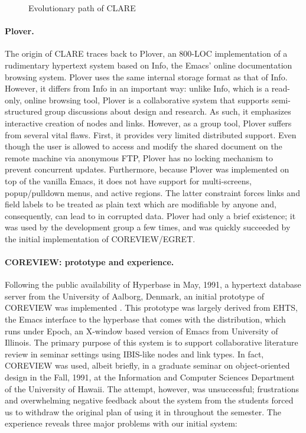 \begin{figure}
  \caption{Evolutionary path of CLARE}
  \label{fig:history}
\end{figure}


\paragraph{Plover.}
\label{sec:plover}

The origin of CLARE traces back to {\sf Plover\/}, an 800-LOC
implementation of a rudimentary hypertext system based on {\sf Info\/}, the
Emacs' online documentation browsing system. Plover uses the same internal
storage format as that of Info. However, it differs from Info in an
important way: unlike Info, which is a read-only, online browsing tool,
Plover is a collaborative system that supports semi-structured group
discussions about design and research. As such, it emphasizes interactive
creation of nodes and links. However, as a group tool, Plover suffers from
several vital flaws. First, it provides very limited distributed support.
Even though the user is allowed to access and modify the shared document on
the remote machine via anonymous FTP, Plover has no locking mechanism to
prevent concurrent updates.  Furthermore, because Plover was implemented on
top of the vanilla Emacs, it does not have support for multi-screens,
popup/pulldown menus, and active regions.  The latter constraint forces
links and field labels to be treated as plain text which are modifiable by
anyone and, consequently, can lead to in corrupted data.  Plover had only a
brief existence; it was used by the development group a few times, and was
quickly succeeded by the initial implementation of COREVIEW/EGRET.


\paragraph{COREVIEW: prototype and experience.}
\label{sec:coreview}

Following the public availability of Hyperbase in May, 1991, a hypertext
database server from the University of Aalborg, Denmark, an initial
prototype of COREVIEW was implemented \cite{csdl-92-03}. This prototype was
largely derived from EHTS, the Emacs interface to the hyperbase that comes
with the distribution, which runs under Epoch, an X-window based version of
Emacs from University of Illinois. The primary purpose of this system is to
support collaborative literature review in seminar settings using IBIS-like
nodes and link types. In fact, COREVIEW was used, albeit briefly, in a
graduate seminar on object-oriented design in the Fall, 1991, at the
Information and Computer Sciences Department of the University of Hawaii.
The attempt, however, was unsuccessful; frustrations and overwhelming
negative feedback about the system from the students forced us to withdraw
the original plan of using it in throughout the semester. The experience
reveals three major problems with our initial system:


